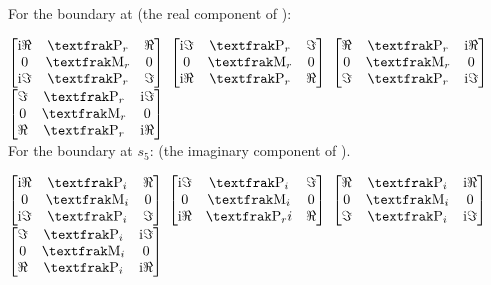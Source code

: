 \documentclass[preprint]{iucr}              %
\numberwithin{equation}{section}
\begin{document}
	For the boundary at \sii{} (the real component of \cii{}):
	
	$\begin{bmatrix}
		
		\textrm{i}\Re{}	& \Plus{}_r		& \Re{} \\
		0				& \Minus{}_r	& 0 \\
		\textrm{i}\Im{}	& \Plus{}_r		& \Im{}
	\end{bmatrix}$
	$\begin{bmatrix}
		\textrm{i}\Im{}	& \Plus{}_r		&  \Im{} \\
		0				& \Minus{}_r	& 0 \\
		\textrm{i}\Re{}	& \Plus{}_r		& \Re{} \\
	\end{bmatrix}$ 
	$\begin{bmatrix}
		\Re{}	&\Plus{}_r		&   \textrm{i}\Re{} \\
		0		& \Minus{}_r	&  0 \\
		\Im{}	&\Plus{}_r		& \textrm{i}\Im{}
	\end{bmatrix}	$ 
	$\begin{bmatrix}
		\Im{}	& \Plus{}_r	& \textrm{i}\Im{} \\
		0		&\Minus{}_r	&  0 \\
		\Re{}	& \Plus{}_r	&  \textrm{i}\Re{} \\
	\end{bmatrix}$ \\
	
	
	For the boundary at $s_5$: (the imaginary component of \cii{}).
	
	$\begin{bmatrix}
		\textrm{i}\Re{}	& \Plus{}_i		& \Re{} \\
		0				& \Minus{}_i	& 0 \\
		\textrm{i}\Im{}	& \Plus{}_i		& \Im{}
	\end{bmatrix}$
	$\begin{bmatrix}
		\textrm{i}\Im{}	& \Plus{}_i		&  \Im{} \\
		0				& \Minus{}_i	& 0 \\
		\textrm{i}\Re{}	& \Plus{}_ri	& \Re{} \\
	\end{bmatrix}$ 
	$\begin{bmatrix}
		\Re{}	&\Plus{}_i		&   \textrm{i}\Re{} \\
		0		& \Minus{}_i	&  0 \\
		\Im{}	&\Plus{}_i		& \textrm{i}\Im{}
	\end{bmatrix}	$ 
	$\begin{bmatrix}
		\Im{}	& \Plus{}_i	& \textrm{i}\Im{} \\
		0		&\Minus{}_i	&  0 \\
		\Re{}	& \Plus{}_i	&  \textrm{i}\Re{} \\
	\end{bmatrix}$ \\
	
\end{document}
